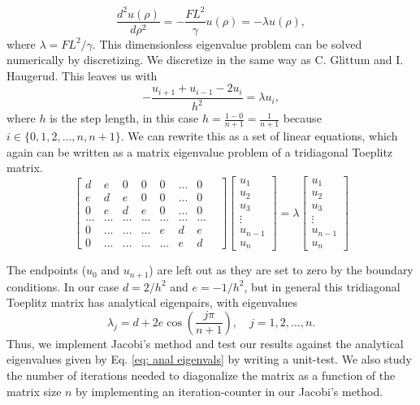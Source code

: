 \documentclass[%
 reprint,
nofootinbib,
aps,
]{revtex4-1}
\begin{document}
\begin{equation}
\frac{d^2 u(\rho)}{d\rho^2} = -\frac{FL^2}{\gamma} u(\rho) = -\lambda u(\rho),
\end{equation}
where $\lambda = FL^2/\gamma$. This dimensionless eigenvalue problem can be solved numerically by discretizing. We discretize in the same way as C. Glittum and I. Haugerud\cite{project1}. This leaves us with
\begin{equation}
-\frac{u_{i+1} + u_{i-1} -2u_i}{h^2} = \lambda u_i,
\end{equation}
where $h$ is the step length, in this case $h = \frac{1-0}{n+1} = \frac{1}{n+1}$ because $i \in \{0,1,2, ..., n, n+1\}$.  We can rewrite this as a set of linear equations, which again can be written as a matrix eigenvalue problem of a tridiagonal Toeplitz matrix.
\begin{equation}\label{eq: matrix}
\begin{bmatrix}
d & e & 0 & 0 & 0 & \dots & 0\\
e & d & e & 0 & 0 & \dots & 0\\
0 & e & d & e & 0 & \dots & 0\\
\dots & \dots & \dots & \dots & \dots & \dots & \dots &\\
0 & \dots & \dots & \dots & e & d & e\\
0 & \dots & \dots & \dots & \dots & e & d
\end{bmatrix}
\begin{bmatrix}
u_1\\
u_2\\
u_3\\
\vdots\\
u_{n-1}\\
u_{n}
\end{bmatrix}
 =
 \lambda
 \begin{bmatrix}
u_1\\
u_2\\
u_3\\
\vdots\\
u_{n-1}\\
u_{n}
\end{bmatrix}
\end{equation}

The endpoints ($u_0$ and $u_{n+1}$) are left out as they are set to zero by the boundary conditions. In our case $d = 2/h^2$ and $e = -1/h^2$, but in general this tridiagonal Toeplitz matrix has analytical eigenpairs, with eigenvalues
\begin{equation}\label{eq: anal eigenvals}
\lambda_j = d + 2e\cos\left(\frac{j\pi}{n+1}\right), \quad j = 1, 2, ..., n.
\end{equation}
Thus, we implement Jacobi's method and test our results against the analytical eigenvalues given by Eq. \eqref{eq: anal eigenvals} by writing a unit-test. We also study the number of iterations needed to diagonalize the matrix as a function of the matrix size $n$ by implementing an iteration-counter in our Jacobi's method.
\end{document}
